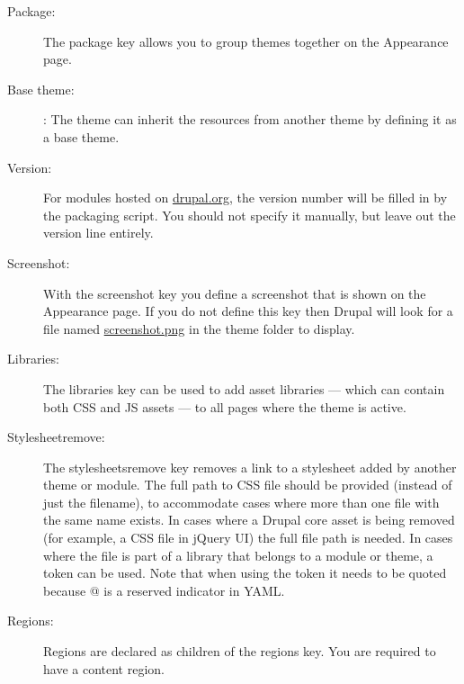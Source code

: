 \begin{description}
	\item[Package:] The package key allows you to group themes together on the Appearance page.
	\item[Base theme:] : The theme can inherit the resources from another theme by defining it as a base theme.
	\item[Version:] For modules hosted on \url{drupal.org}, the version number will be filled in by the packaging script. You should not specify it manually, but leave out the version line entirely.
	\item[Screenshot:] With the screenshot key you define a screenshot that is shown on the	Appearance page. If you do not define this key then Drupal will look for a file named \url{screenshot.png} in the theme folder to display.
	\item[Libraries:] The libraries key can be used to add asset libraries — which can contain both CSS and JS assets — to all pages where the theme is active.
	\item[Stylesheet­remove:] The stylesheets­remove key removes a link to a stylesheet added by another theme or module. The full path to CSS file should be provided (instead of just the filename), to accommodate cases where more than one file with the same name exists. In cases where a Drupal core asset is being removed (for example, a CSS file in jQuery UI) the full file path is needed. In cases where the file is part of a library that belongs to a module or theme, a token can be used. Note that when using the token it needs to be quoted because @ is a reserved indicator in YAML.
	\item[Regions:] Regions are declared as children of the regions key. You are required to have a content region.

\end{description}
